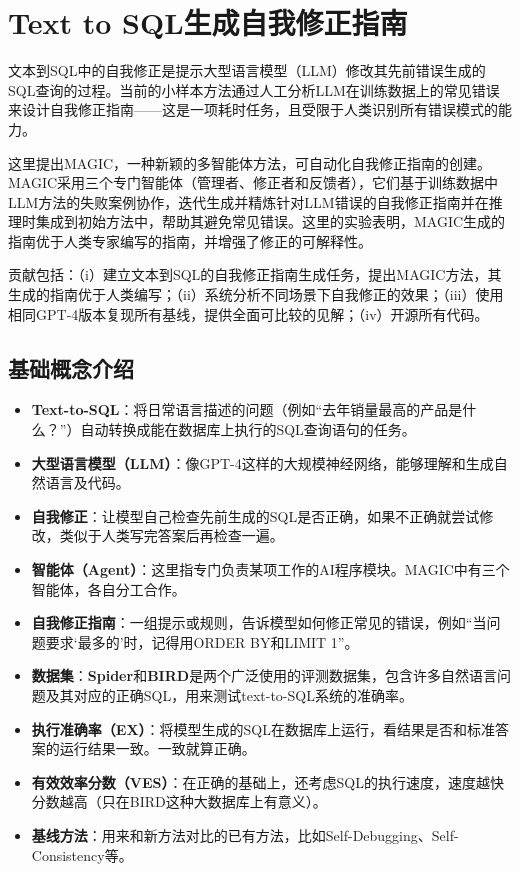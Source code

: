 \chapter{Text to SQL生成自我修正指南}

文本到SQL中的自我修正是提示大型语言模型（LLM）修改其先前错误生成的SQL查询的过程。当前的小样本方法通过人工分析LLM在训练数据上的常见错误来设计自我修正指南——这是一项耗时任务，且受限于人类识别所有错误模式的能力。

这里提出MAGIC，一种新颖的多智能体方法，可自动化自我修正指南的创建。MAGIC采用三个专门智能体（管理者、修正者和反馈者），它们基于训练数据中LLM方法的失败案例协作，迭代生成并精炼针对LLM错误的自我修正指南并在推理时集成到初始方法中，帮助其避免常见错误。这里的实验表明，MAGIC生成的指南优于人类专家编写的指南，并增强了修正的可解释性。

贡献包括：（i）建立文本到SQL的自我修正指南生成任务，提出MAGIC方法，其生成的指南优于人类编写；（ii）系统分析不同场景下自我修正的效果；（iii）使用相同GPT-4版本复现所有基线，提供全面可比较的见解；（iv）开源所有代码。

\section*{基础概念介绍}
\begin{itemize}
    \item \textbf{Text-to-SQL}：将日常语言描述的问题（例如“去年销量最高的产品是什么？”）自动转换成能在数据库上执行的SQL查询语句的任务。
    \item \textbf{大型语言模型（LLM）}：像GPT-4这样的大规模神经网络，能够理解和生成自然语言及代码。
    \item \textbf{自我修正}：让模型自己检查先前生成的SQL是否正确，如果不正确就尝试修改，类似于人类写完答案后再检查一遍。
    \item \textbf{智能体（Agent）}：这里指专门负责某项工作的AI程序模块。MAGIC中有三个智能体，各自分工合作。
    \item \textbf{自我修正指南}：一组提示或规则，告诉模型如何修正常见的错误，例如“当问题要求‘最多的’时，记得用ORDER BY和LIMIT 1”。
    \item \textbf{数据集}：\textbf{Spider}和\textbf{BIRD}是两个广泛使用的评测数据集，包含许多自然语言问题及其对应的正确SQL，用来测试text-to-SQL系统的准确率。
    \item \textbf{执行准确率（EX）}：将模型生成的SQL在数据库上运行，看结果是否和标准答案的运行结果一致。一致就算正确。
    \item \textbf{有效效率分数（VES）}：在正确的基础上，还考虑SQL的执行速度，速度越快分数越高（只在BIRD这种大数据库上有意义）。
    \item \textbf{基线方法}：用来和新方法对比的已有方法，比如Self-Debugging、Self-Consistency等。
\end{itemize}


